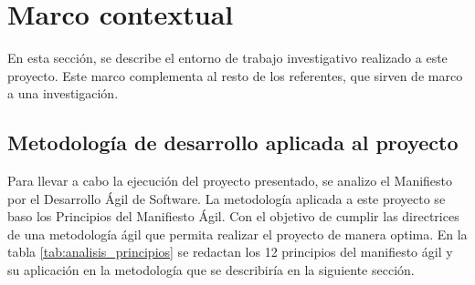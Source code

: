 \section{Marco contextual}

En esta sección, se describe el entorno de trabajo investigativo realizado a este proyecto. Este marco complementa al resto de los referentes, que sirven de marco a una investigación.

\subsection{Metodología de desarrollo aplicada al proyecto}

Para llevar a cabo la ejecución del proyecto presentado, se analizo el Manifiesto por el Desarrollo Ágil de Software. La metodología aplicada a este proyecto se baso los Principios del Manifiesto Ágil. Con el objetivo de cumplir las directrices de una metodología ágil que permita realizar el proyecto de manera optima. En la tabla \ref{tab:analisis_principios} se redactan los 12 principios del manifiesto ágil y su aplicación en la metodología que se describiría en la siguiente sección. 

